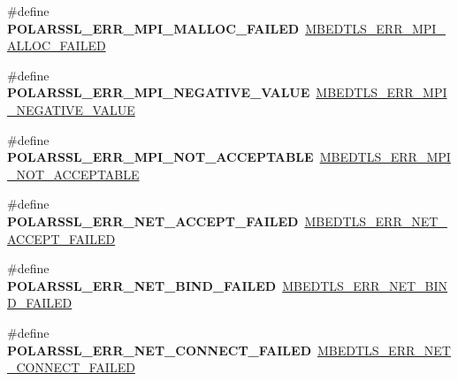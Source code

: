 \begin{DoxyCompactItemize}
\item 
\mbox{\label{compat-1_83_8h_ad288a13737d14f102748c3184ed5a494}} 
\#define {\bfseries P\+O\+L\+A\+R\+S\+S\+L\+\_\+\+E\+R\+R\+\_\+\+M\+P\+I\+\_\+\+M\+A\+L\+L\+O\+C\+\_\+\+F\+A\+I\+L\+ED}~\mbox{\hyperlink{bignum_8h_a9bb66b22357ba30dedfe856efeab5544}{M\+B\+E\+D\+T\+L\+S\+\_\+\+E\+R\+R\+\_\+\+M\+P\+I\+\_\+\+A\+L\+L\+O\+C\+\_\+\+F\+A\+I\+L\+ED}}
\item 
\mbox{\label{compat-1_83_8h_afbbffbd20b56d2b8f3db8edf76cdbdb4}} 
\#define {\bfseries P\+O\+L\+A\+R\+S\+S\+L\+\_\+\+E\+R\+R\+\_\+\+M\+P\+I\+\_\+\+N\+E\+G\+A\+T\+I\+V\+E\+\_\+\+V\+A\+L\+UE}~\mbox{\hyperlink{bignum_8h_ab7f06e7dfde557a02fe7137d4d47eed3}{M\+B\+E\+D\+T\+L\+S\+\_\+\+E\+R\+R\+\_\+\+M\+P\+I\+\_\+\+N\+E\+G\+A\+T\+I\+V\+E\+\_\+\+V\+A\+L\+UE}}
\item 
\mbox{\label{compat-1_83_8h_ac42cb2c2b13df48182ee833de2e4adbf}} 
\#define {\bfseries P\+O\+L\+A\+R\+S\+S\+L\+\_\+\+E\+R\+R\+\_\+\+M\+P\+I\+\_\+\+N\+O\+T\+\_\+\+A\+C\+C\+E\+P\+T\+A\+B\+LE}~\mbox{\hyperlink{bignum_8h_a24f0dfbee8599f6e72852247d5681503}{M\+B\+E\+D\+T\+L\+S\+\_\+\+E\+R\+R\+\_\+\+M\+P\+I\+\_\+\+N\+O\+T\+\_\+\+A\+C\+C\+E\+P\+T\+A\+B\+LE}}
\item 
\mbox{\label{compat-1_83_8h_ad82bbf5012b60516118c5b85e4a73db9}} 
\#define {\bfseries P\+O\+L\+A\+R\+S\+S\+L\+\_\+\+E\+R\+R\+\_\+\+N\+E\+T\+\_\+\+A\+C\+C\+E\+P\+T\+\_\+\+F\+A\+I\+L\+ED}~\mbox{\hyperlink{net__sockets_8h_a030cd35e75797c983c61152fd36bd135}{M\+B\+E\+D\+T\+L\+S\+\_\+\+E\+R\+R\+\_\+\+N\+E\+T\+\_\+\+A\+C\+C\+E\+P\+T\+\_\+\+F\+A\+I\+L\+ED}}
\item 
\mbox{\label{compat-1_83_8h_a14395a416f051e26a9918052614b34d8}} 
\#define {\bfseries P\+O\+L\+A\+R\+S\+S\+L\+\_\+\+E\+R\+R\+\_\+\+N\+E\+T\+\_\+\+B\+I\+N\+D\+\_\+\+F\+A\+I\+L\+ED}~\mbox{\hyperlink{net__sockets_8h_a4dbd66233b3f8bdd812f388667fcf123}{M\+B\+E\+D\+T\+L\+S\+\_\+\+E\+R\+R\+\_\+\+N\+E\+T\+\_\+\+B\+I\+N\+D\+\_\+\+F\+A\+I\+L\+ED}}
\item 
\mbox{\label{compat-1_83_8h_aa316f63c8e1deda24d3ae1d146854474}} 
\#define {\bfseries P\+O\+L\+A\+R\+S\+S\+L\+\_\+\+E\+R\+R\+\_\+\+N\+E\+T\+\_\+\+C\+O\+N\+N\+E\+C\+T\+\_\+\+F\+A\+I\+L\+ED}~\mbox{\hyperlink{net__sockets_8h_acdd34e19acf5a23c593895605bf3f219}{M\+B\+E\+D\+T\+L\+S\+\_\+\+E\+R\+R\+\_\+\+N\+E\+T\+\_\+\+C\+O\+N\+N\+E\+C\+T\+\_\+\+F\+A\+I\+L\+ED}}

\end{DoxyCompactItemize}

